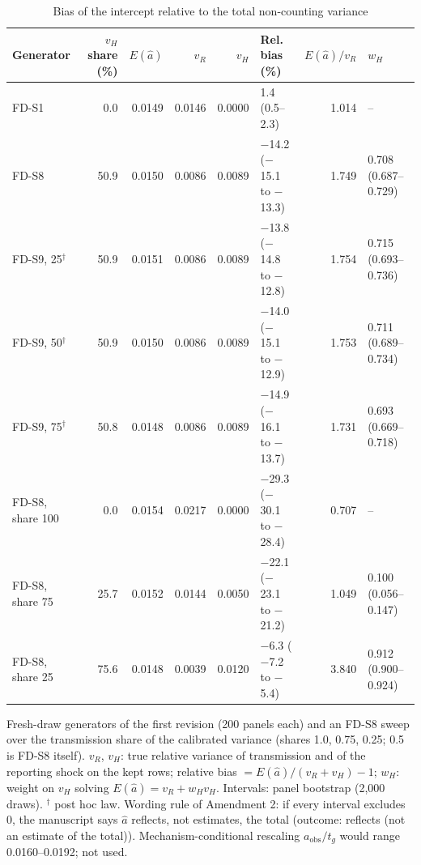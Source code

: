 \begin{table}[!tbp]
\centering
\scriptsize\renewcommand{\arraystretch}{1.15}
\setlength{\tabcolsep}{3pt}
\caption{Bias of the intercept relative to the total non-counting variance}
\label{tab:r2-bias}
\begin{tabularx}{\linewidth}{@{}Xrrrrlrl@{}}
\toprule
Generator & $v_H$ share (\%) & $E(\hat a)$ & $v_R$ & $v_H$ & Rel. bias (\%) & $E(\hat a)/v_R$ & $w_H$ \\
\midrule
FD-S1 & 0.0 & 0.0149 & 0.0146 & 0.0000 & 1.4 (0.5--2.3) & 1.014 & -- \\
FD-S8 & 50.9 & 0.0150 & 0.0086 & 0.0089 & $-$14.2 ($-$15.1 to $-$13.3) & 1.749 & 0.708 (0.687--0.729) \\
FD-S9, 25$^\dagger$ & 50.9 & 0.0151 & 0.0086 & 0.0089 & $-$13.8 ($-$14.8 to $-$12.8) & 1.754 & 0.715 (0.693--0.736) \\
FD-S9, 50$^\dagger$ & 50.9 & 0.0150 & 0.0086 & 0.0089 & $-$14.0 ($-$15.1 to $-$12.9) & 1.753 & 0.711 (0.689--0.734) \\
FD-S9, 75$^\dagger$ & 50.8 & 0.0148 & 0.0086 & 0.0089 & $-$14.9 ($-$16.1 to $-$13.7) & 1.731 & 0.693 (0.669--0.718) \\
FD-S8, share 100 & 0.0 & 0.0154 & 0.0217 & 0.0000 & $-$29.3 ($-$30.1 to $-$28.4) & 0.707 & -- \\
FD-S8, share 75 & 25.7 & 0.0152 & 0.0144 & 0.0050 & $-$22.1 ($-$23.1 to $-$21.2) & 1.049 & 0.100 (0.056--0.147) \\
FD-S8, share 25 & 75.6 & 0.0148 & 0.0039 & 0.0120 & $-$6.3 ($-$7.2 to $-$5.4) & 3.840 & 0.912 (0.900--0.924) \\
\bottomrule
\end{tabularx}
\par\smallskip\parbox{\linewidth}{\scriptsize\linespread{1.15}\selectfont Fresh-draw generators of the first revision (200 panels each) and an FD-S8 sweep over the transmission share of the calibrated variance (shares 1.0, 0.75, 0.25; 0.5 is FD-S8 itself). $v_R$, $v_H$: true relative variance of transmission and of the reporting shock on the kept rows; relative bias $=E(\hat a)/(v_R+v_H)-1$; $w_H$: weight on $v_H$ solving $E(\hat a)=v_R+w_Hv_H$. Intervals: panel bootstrap (2,000 draws). $^\dagger$ post hoc law. Wording rule of Amendment 2: if every interval excludes 0, the manuscript says $\hat a$ reflects, not estimates, the total (outcome: reflects (not an estimate of the total)). Mechanism-conditional rescaling $a_{\mathrm{obs}}/t_g$ would range 0.0160--0.0192; not used.}
\end{table}

